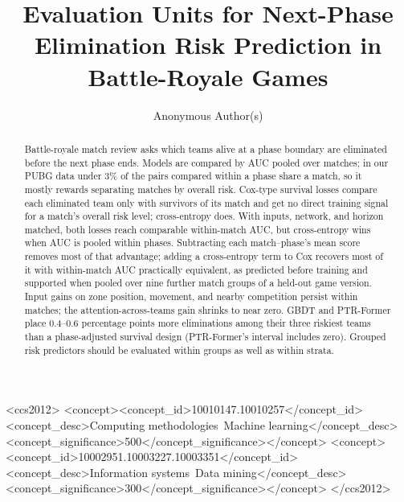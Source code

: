 \documentclass[sigconf,anonymous]{acmart}
\begin{document}
\title{Evaluation Units for Next-Phase Elimination Risk Prediction in Battle-Royale Games}
\renewcommand{\shorttitle}{Evaluation Units for Next-Phase Elimination Prediction}

\author{Anonymous Author(s)}

\begin{abstract}
Battle-royale match review asks which teams alive at a phase boundary are eliminated before the next phase ends. Models are compared by AUC pooled over matches; in our PUBG data under 3\% of the pairs compared within a phase share a match, so it mostly rewards separating matches by overall risk. Cox-type survival losses compare each eliminated team only with survivors of its match and get no direct training signal for a match's overall risk level; cross-entropy does. With inputs, network, and horizon matched, both losses reach comparable within-match AUC, but cross-entropy wins when AUC is pooled within phases. Subtracting each match--phase's mean score removes most of that advantage; adding a cross-entropy term to Cox recovers most of it with within-match AUC practically equivalent, as predicted before training and supported when pooled over nine further match groups of a held-out game version. Input gains on zone position, movement, and nearby competition persist within matches; the attention-across-teams gain shrinks to near zero. GBDT and PTR-Former place 0.4--0.6 percentage points more eliminations among their three riskiest teams than a phase-adjusted survival design (PTR-Former's interval includes zero). Grouped risk predictors should be evaluated within groups as well as within strata.
\end{abstract}
\begin{CCSXML}
<ccs2012>
<concept><concept_id>10010147.10010257</concept_id><concept_desc>Computing methodologies~Machine learning</concept_desc><concept_significance>500</concept_significance></concept>
<concept><concept_id>10002951.10003227.10003351</concept_id><concept_desc>Information systems~Data mining</concept_desc><concept_significance>300</concept_significance></concept>
</ccs2012>
\end{CCSXML}
\maketitle
\end{document}
